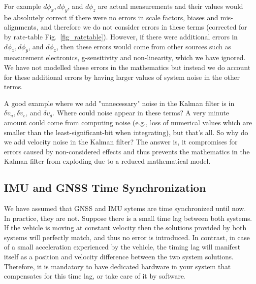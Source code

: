 \documentclass[journal]{IEEEtran}
\begin{document}
For example $d\phi_x, d\phi_y $, and $d\phi_z$ are actual measurements and their values would be absolutely correct if there were no errors in scale factors, biases and mis-alignments, and therefore we do not consider errors in these terms (corrected for by rate-table Fig.~\ref{fig_ratetable}).
However, if there were additional errors in $d\phi_x, d\phi_y $, and $d\phi_z$, then these errors would come from other sources such as measurement electronics, g-sensitivity and non-linearity, which we have ignored. We have not modelled these errors in the mathematics but instead we do account for these additional errors by having larger values of system noise in the other terms.\par
A good example where we add "unnecessary" noise in the Kalman filter is in $\delta v_n, \delta v_e$, and $\delta v_d$. Where could noise appear in these terms? A very minute amount could come from computing noise (e.g., loss of numerical values which are smaller than the least-significant-bit when integrating), but that's all. So why do we add velocity noise in the Kalman filter? The answer is, it compromises for errors caused by non-considered effects and thus prevents the mathematics in the Kalman filter from exploding due to a reduced mathematical model.



%
\subsection{IMU and GNSS Time Synchronization}
We have assumed that GNSS and IMU sytems are time synchronized until now. In practice, they are not.
Suppose there is a small time lag between both systems. If the vehicle is moving at constant velocity then the solutions provided by both systems will perfectly match, and thus no error is introduced. In contrast, in case of a small acceleration experienced by the vehicle, the timing lag will manifest itself as a position and velocity difference between the two system solutions. Therefore, it is mandatory to have dedicated hardware in your system that compensates for this time lag, or take care of it by software.




\end{document}
